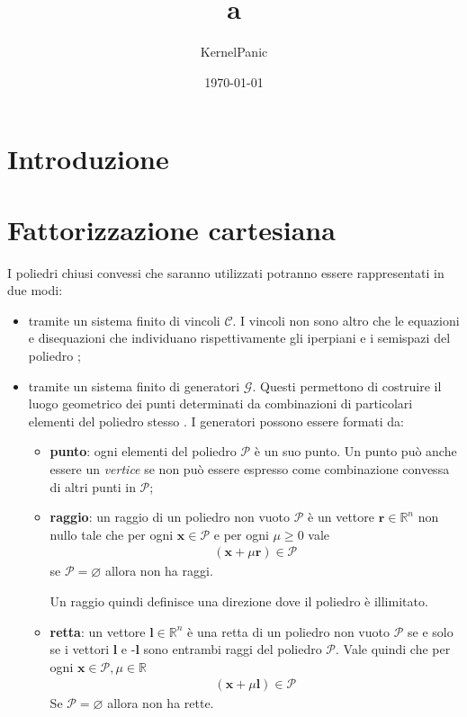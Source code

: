 \documentclass{mimosis}
\author{KernelPanic}
\date{\today}
\title{a}
\theoremstyle{definition}
\let\emptyset\varnothing
\begin{document}
\maketitle
\tableofcontents


\chapter{Introduzione}
\label{sec:org43ca5fa}

\chapter{Fattorizzazione cartesiana}
\label{sec:org524addd}
I poliedri chiusi convessi che saranno utilizzati potranno essere rappresentati
in due modi:

\begin{itemize}
\item tramite un sistema finito di vincoli \(\mathcal{C}\). I vincoli
non sono altro che le equazioni e disequazioni che individuano rispettivamente
gli iperpiani e i semispazi del poliedro \cite{Becchi17th};
\item tramite un sistema finito di generatori \(\mathcal{G}\). Questi
permettono di costruire il luogo geometrico dei punti determinati da
combinazioni di particolari elementi del poliedro stesso \cite{Becchi17th}. I
generatori possono essere formati da:
\begin{itemize}
\item \textbf{punto}: ogni elementi del poliedro \(\mathcal{P}\) è un suo punto. Un punto
può anche essere un \emph{vertice} se non può essere espresso come combinazione
convessa di altri punti in \(\mathcal{P}\);
\item \textbf{raggio}: un raggio di un poliedro non vuoto \(\mathcal{P}\) è un vettore
\(\bm{r} \in \mathbb{R}^n\) non nullo tale che per ogni \(\bm{x} \in
    \mathcal{P}\) e per ogni \(\mu \ge 0\) vale
\begin{align*}
(\bm{x} + \mu \bm{r}) \in \mathcal{P}
\end{align*}
se \(\mathcal{P} = \emptyset\) allora non ha raggi.

Un raggio quindi definisce una direzione dove il poliedro è illimitato.
\item \textbf{retta}: un vettore \(\bm{l} \in \mathbb{R}^n\) è una retta di un poliedro non
vuoto \(\mathcal{P}\) se e solo se i vettori \(\bm{l}\) e -\(\bm{l}\) sono
entrambi raggi del poliedro \(\mathcal{P}\). Vale quindi che per ogni \(\bm{x}
    \in \mathcal{P}, \mu \in \mathbb{R}\)
\begin{align*}
(\bm{x} + \mu\bm{l}) \in \mathcal{P}
\end{align*}
Se \(\mathcal{P} = \emptyset\) allora non ha rette.


\end{itemize}
\end{itemize}
\end{document}
